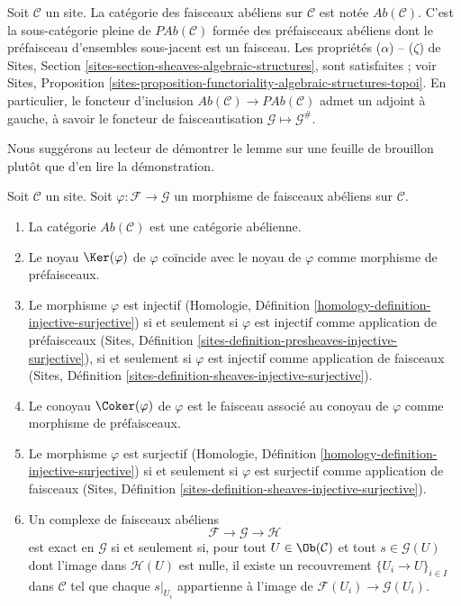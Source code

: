 \noindent
Soit $\mathcal{C}$ un site. La catégorie des faisceaux abéliens sur
$\mathcal{C}$ est notée $\textit{Ab}(\mathcal{C})$. C'est la sous-catégorie
pleine de $\textit{PAb}(\mathcal{C})$ formée des préfaisceaux abéliens dont le
préfaisceau d'ensembles sous-jacent est un faisceau. Les propriétés
($\alpha$) -- ($\zeta$) de Sites, Section
\ref{sites-section-sheaves-algebraic-structures}, sont satisfaites ; voir
Sites, Proposition
\ref{sites-proposition-functoriality-algebraic-structures-topoi}. En
particulier, le foncteur d'inclusion
$\textit{Ab}(\mathcal{C}) \to \textit{PAb}(\mathcal{C})$ admet un adjoint à
gauche, à savoir le foncteur de faisceautisation
$\mathcal{G} \mapsto \mathcal{G}^\#$.

\medskip\noindent
Nous suggérons au lecteur de démontrer le lemme sur une feuille de brouillon
plutôt que d'en lire la démonstration.

\begin{lemma}
\label{lemma-abelian-abelian}
Soit $\mathcal{C}$ un site. Soit $\varphi : \mathcal{F} \to \mathcal{G}$
un morphisme de faisceaux abéliens sur $\mathcal{C}$.
\begin{enumerate}
\item La catégorie $\textit{Ab}(\mathcal{C})$ est une catégorie abélienne.
\item Le noyau $\Ker(\varphi)$ de $\varphi$ coïncide avec le noyau de
$\varphi$ comme morphisme de préfaisceaux.
\item Le morphisme $\varphi$ est injectif (Homologie, Définition
\ref{homology-definition-injective-surjective}) si et seulement si $\varphi$ est
injectif comme application de préfaisceaux (Sites, Définition
\ref{sites-definition-presheaves-injective-surjective}), si et seulement si
$\varphi$ est injectif comme application de faisceaux (Sites, Définition
\ref{sites-definition-sheaves-injective-surjective}).
\item Le conoyau $\Coker(\varphi)$ de $\varphi$ est le faisceau associé au
conoyau de $\varphi$ comme morphisme de préfaisceaux.
\item Le morphisme $\varphi$ est surjectif (Homologie, Définition
\ref{homology-definition-injective-surjective}) si et seulement si $\varphi$ est
surjectif comme application de faisceaux (Sites, Définition
\ref{sites-definition-sheaves-injective-surjective}).
\item Un complexe de faisceaux abéliens
$$
\mathcal{F} \to \mathcal{G} \to \mathcal{H}
$$
est exact en $\mathcal{G}$ si et seulement si, pour tout
$U \in \Ob(\mathcal{C})$ et tout $s \in \mathcal{G}(U)$ dont l'image dans
$\mathcal{H}(U)$ est nulle, il existe un recouvrement
$\{U_i \to U\}_{i \in I}$ dans $\mathcal{C}$ tel que chaque $s|_{U_i}$
appartienne à l'image de $\mathcal{F}(U_i) \to \mathcal{G}(U_i)$.
\end{enumerate}
\end{lemma}

